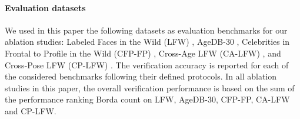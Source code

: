 \documentclass[10pt,twocolumn,letterpaper]{ieeeconf}
\begin{document}
\paragraph{Evaluation datasets}
We used in this paper the following datasets as evaluation benchmarks for our ablation studies: Labeled Faces in the Wild (LFW) \cite{LFW}, AgeDB-30 \cite{agedb}, Celebrities in Frontal to Profile in the Wild (CFP-FP) \cite{cfpfp}, Cross-Age LFW (CA-LFW) \cite{calfw}, and Cross-Pose LFW (CP-LFW) \cite{cplfw}. The verification accuracy is reported for each of the considered benchmarks following their defined protocols. In all ablation studies in this paper, the overall verification performance is based on the sum of the performance ranking Borda count on LFW, AgeDB-30, CFP-FP, CA-LFW and CP-LFW.




\begin{table}[ht]
\caption{Percentage of comparison scores that are larger than different operation thresholds at FMR100 and FMR1000 for R-R and R-S impostor comparison. The percentage number indicates how many comparisons are falsely matched as genuine. The low percentage for the R-S setting and its similarity to R-R indicates that the identities of the authentic data is not linked to these of the synthetic data.}
\label{tab:percentage_above_th}
\vspace{-4mm}
\end{table}
\end{document}
